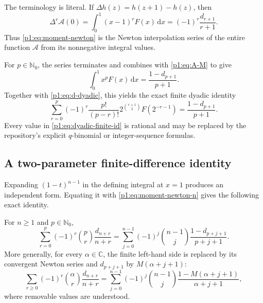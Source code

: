 \documentclass[11pt,oneside]{article}
\theoremstyle{definition}
\theoremstyle{remark}
\newcommand{\C}{\mathbb C}
\newcommand{\N}{\mathbb N}
\newcommand{\dd}{\,\mathrm d}
\newcommand{\1}{\mathbf 1}
\begin{document}
The terminology is literal.  If \(\Delta h(z)=h(z+1)-h(z)\), then
\begin{equation}
 \Delta^r\mathcal A(0)
 =\int_0^1(x-1)^rF(x)\dd x
 =(-1)^r\frac{d_{r+1}}{r+1}.                                  \label{p1:eq:Newton-difference}
\end{equation}
Thus \eqref{p1:eq:moment-newton} is the Newton interpolation series of the entire
function \(\mathcal A\) from its nonnegative integral values.

For \(p\in\N_0\), the series terminates and combines with \eqref{p1:eq:A-M} to
give
\begin{equation}
 \boxed{\quad
 \int_0^1x^pF(x)\dd x=\frac{1-d_{p+1}}{p+1}.
 \quad}                                                        \label{p1:eq:integer-definite}
\end{equation}
Together with \eqref{p1:eq:d-dyadic}, this yields the exact finite dyadic identity
\begin{equation}
 \sum_{r=0}^{p}(-1)^r\frac{p!}{(p-r)!}
 2^{\binom{r+1}{2}}F(2^{-r-1})
 =\frac{1-d_{p+1}}{p+1}.                                      \label{p1:eq:dyadic-finite-id}
\end{equation}
Every value in \eqref{p1:eq:dyadic-finite-id} is rational and may be replaced by
the repository's explicit \(q\)-binomial or integer-sequence formulas.

\subsection{A two-parameter finite-difference identity}
Expanding \((1-t)^{n-1}\) in the defining integral at \(x=1\) produces an
independent form.  Equating it with \eqref{p1:eq:moment-newton-n} gives the
following exact identity.

\begin{corollary}\label{p1:cor:two-param}
For \(n\geq1\) and \(p\in\N_0\),
\begin{equation}
 \boxed{\quad
 \sum_{r=0}^{p}(-1)^r\binom pr\frac{d_{n+r}}{n+r}
 =\sum_{j=0}^{n-1}(-1)^j\binom{n-1}{j}
 \frac{1-d_{p+j+1}}{p+j+1}.
 \quad}                                                        \label{p1:eq:two-param-id}
\end{equation}
More generally, for every \(\alpha\in\C\), the finite left-hand side is
replaced by its convergent Newton series and \(d_{p+j+1}\) by
\(M(\alpha+j+1)\):
\begin{equation}
 \sum_{r\geq0}(-1)^r\binom\alpha r\frac{d_{n+r}}{n+r}
 =\sum_{j=0}^{n-1}(-1)^j\binom{n-1}{j}
 \frac{1-M(\alpha+j+1)}{\alpha+j+1},                           \label{p1:eq:two-param-entire}
\end{equation}
where removable values are understood.
\end{corollary}
\end{document}
